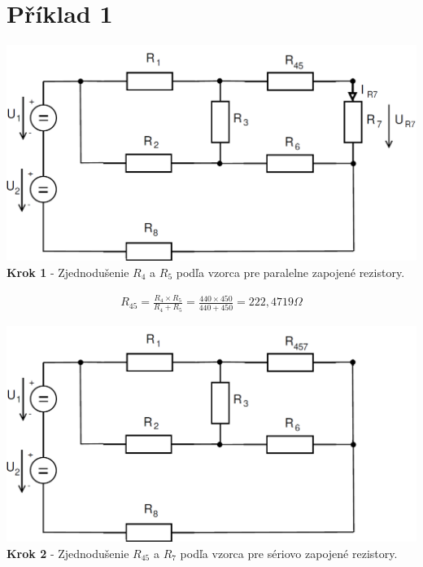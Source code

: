 \section{Příklad 1}

 
\begin{center}
\includegraphics[scale=0.5,keepaspectratio]{fig/obr/Pr1_1.png} \\
\textbf{Krok 1} - Zjednodušenie $R_{4}$ a $R_{5}$ podľa vzorca pre paralelne zapojené rezistory.
\end{center}

\begin{gather*}
R_{45}=\frac{R_{4} \times R_{5}}{R_{4}+R_{5}}=\frac{440 \times 450}{440+450}=222,4719\Omega 
\end{gather*}



\begin{center}
\includegraphics[scale=0.5,keepaspectratio]{fig/obr/Pr1_2.png} \\
\textbf{Krok 2} - Zjednodušenie $R_{45}$ a $R_{7}$ podľa vzorca pre sériovo zapojené rezistory.
\end{center}

